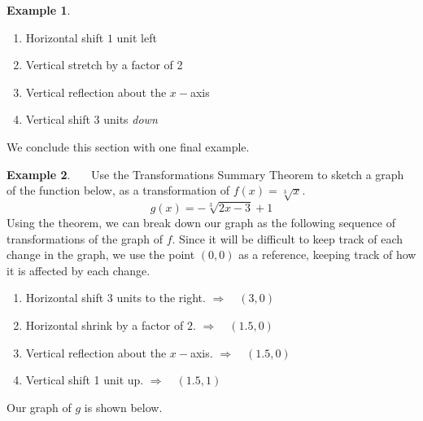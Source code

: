 \documentclass[11pt]{book}
\theoremstyle{definition}  %
\newtheorem{example}{Example}[chapter]
\begin{document}
\begin{example}
\begin{center}
\begin{enumerate}
	\item Horizontal shift $1$ unit left
	\item Vertical stretch by a factor of 2
	\item Vertical reflection about the $x-$axis
	\item Vertical shift $3$ units \textit{down}
\end{enumerate}
\end{center}
\end{example}
\newpage

We conclude this section with one final example.

\begin{example}~~~Use the Transformations Summary Theorem to sketch a graph of the function below, as a transformation of $f(x)=\sqrt[3]{x}$.
$$g(x)=-\sqrt[3]{2x-3}+1$$
Using the theorem, we can break down our graph as the following sequence of transformations of the graph of $f$.  Since it will be difficult to keep track of each change in the graph, we use the point $(0,0)$ as a reference, keeping track of how it is affected by each change.
\begin{enumerate}
	\item Horizontal shift 3 units to the right. $\Rightarrow$~~$(3,0)$
	\item Horizontal shrink by a factor of $2$. $\Rightarrow$~~$(1.5,0)$
	\item Vertical reflection about the $x-$axis. $\Rightarrow$~~$(1.5,0)$
	\item Vertical shift 1 unit up. $\Rightarrow$~~$(1.5,1)$
\end{enumerate}
Our graph of $g$ is shown below.
\begin{center}

\end{center}
\end{example}
\end{document}
